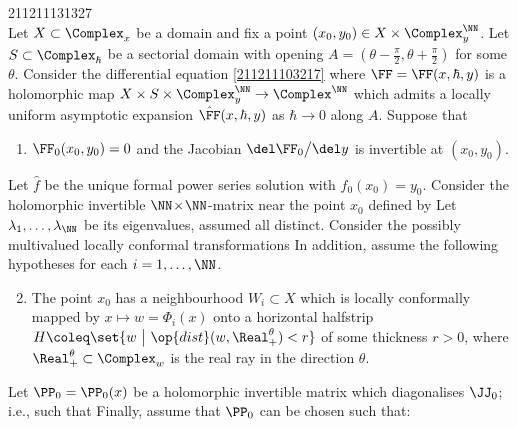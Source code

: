 \documentclass[11pt]{article}
\begin{document}
\begin{thm}{211211131327}
\mbox{}\\
Let $X \subset \Complex_x$ be a domain and fix a point $(x_0, y_0) \in X \times \Complex^\NN_y$.
Let $S \subset \Complex_\hbar$ be a sectorial domain with opening $A = (\theta - \tfrac{\pi}{2}, \theta + \tfrac{\pi}{2})$ for some $\theta$.
Consider the differential equation \eqref{211211103217} where $\FF = \FF (x, \hbar, y)$ is a holomorphic map $X \times S \times \Complex_y^\NN \to \Complex^\NN$ which admits a locally uniform asymptotic expansion $\hat{\FF} (x,\hbar,y)$ as $\hbar \to 0$ along $A$.
Suppose that
\begin{enumerate}
\item $\FF_0 (x_0, y_0) = 0$ and the Jacobian $\del \FF_0 \big/ \del y$ is invertible at $(x_0, y_0)$.
\end{enumerate}
Let $\hat{f}$ be the unique formal power series solution with $f_0 (x_0) = y_0$.
Consider the holomorphic invertible $\NN\!\times\!\NN$-matrix near the point $x_0$ defined by
Let $\lambda_1, \ldots, \lambda_\NN$ be its eigenvalues, assumed all distinct.
Consider the possibly multivalued locally conformal transformations
In addition, assume the following hypotheses for each $i = 1, \ldots, \NN$.
\begin{enumerate}
\setcounter{enumi}{1}
\item The point $x_0$ has a neighbourhood $W_i \subset X$ which is locally conformally mapped by $x \mapsto w = \Phi_i (x)$ onto a horizontal halfstrip $H \coleq \set{w ~\big|~ \op{dist} (w, \Real^\theta_+) < r}$ of some thickness $r > 0$, where $\Real^\theta_+ \subset \Complex_w$ is the real ray in the direction $\theta$.
\end{enumerate}
Let $\PP_0 = \PP_0 (x)$ be a holomorphic invertible matrix which diagonalises $\JJ_0$; i.e., such that 
Finally, assume that $\PP_0$ can be chosen such that:
\begin{enumerate}

\end{enumerate}
\end{thm}
\end{document}
